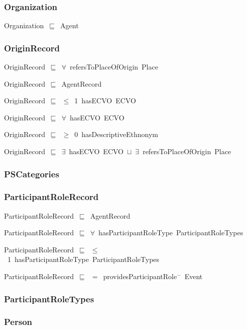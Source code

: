 \documentclass{article}
\begin{document}
\subsubsection*{Organization}

Organization~\ensuremath{\sqsubseteq}~Agent~

\subsubsection*{OriginRecord}

OriginRecord~\ensuremath{\sqsubseteq}~\ensuremath{\forall}~refersToPlaceOfOrigin~Place~

OriginRecord~\ensuremath{\sqsubseteq}~AgentRecord~

OriginRecord~\ensuremath{\sqsubseteq}~\ensuremath{\leq}~1~hasECVO~ECVO~

OriginRecord~\ensuremath{\sqsubseteq}~\ensuremath{\forall}~hasECVO~ECVO~

OriginRecord~\ensuremath{\sqsubseteq}~\ensuremath{\geq}~0~hasDescriptiveEthnonym~

OriginRecord~\ensuremath{\sqsubseteq}~\ensuremath{\exists}~hasECVO~ECVO~\ensuremath{\sqcup}~\ensuremath{\exists}~refersToPlaceOfOrigin~Place~

\subsubsection*{PSCategories}

\subsubsection*{ParticipantRoleRecord}

ParticipantRoleRecord~\ensuremath{\sqsubseteq}~AgentRecord~

ParticipantRoleRecord~\ensuremath{\sqsubseteq}~\ensuremath{\forall}~hasParticipantRoleType~ParticipantRoleTypes~

ParticipantRoleRecord~\ensuremath{\sqsubseteq}~\ensuremath{\leq}~1~hasParticipantRoleType~ParticipantRoleTypes~

ParticipantRoleRecord~\ensuremath{\sqsubseteq}~\ensuremath{=}~providesParticipantRole\ensuremath{^-}~Event~

\subsubsection*{ParticipantRoleTypes}

\subsubsection*{Person}
\end{document}
